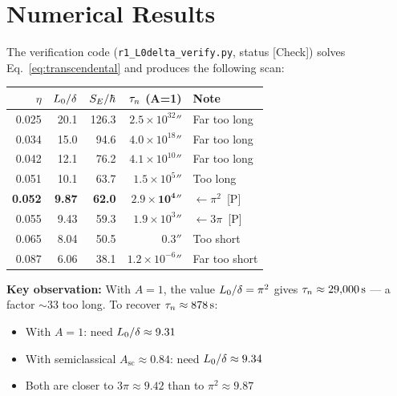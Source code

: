\section{Numerical Results}
\label{sec:L0d:results}

The verification code (\texttt{r1\_L0delta\_verify.py}, status [Check]) solves
Eq.~\eqref{eq:transcendental} and produces the following scan:

\begin{center}
\begin{tabular}{rrrrl}
\toprule
$\eta$ & $L_0/\delta$ & $S_E/\hbar$ & $\tau_n$ (A=1) & Note \\
\midrule
0.025 & 20.1 & 126.3 & $2.5 \times 10^{32}\second$ & Far too long \\
0.034 & 15.0 & 94.6  & $4.0 \times 10^{18}\second$ & Far too long \\
0.042 & 12.1 & 76.2  & $4.1 \times 10^{10}\second$ & Far too long \\
0.051 & 10.1 & 63.7  & $1.5 \times 10^{5}\second$  & Too long \\
\textbf{0.052} & \textbf{9.87} & \textbf{62.0} & $\mathbf{2.9 \times 10^{4}}\second$ &
    $\leftarrow \pi^2$~[P] \\
0.055 & 9.43 & 59.3  & $1.9 \times 10^{3}\second$  & $\leftarrow 3\pi$~[P] \\
0.065 & 8.04 & 50.5  & $0.3\second$                 & Too short \\
0.087 & 6.06 & 38.1  & $1.2 \times 10^{-6}\second$  & Far too short \\
\bottomrule
\end{tabular}
\end{center}

\textbf{Key observation:} With $A = 1$, the value $L_0/\delta = \pi^2$ gives
$\tau_n \approx 29{,}000\,\mathrm{s}$ --- a factor $\sim 33$ too long. To recover
$\tau_n \approx 878\,\mathrm{s}$:
\begin{itemize}
    \item With $A = 1$: need $L_0/\delta \approx 9.31$
    \item With semiclassical $A_{\text{sc}} \approx 0.84$: need
          $L_0/\delta \approx 9.34$
    \item Both are closer to $3\pi \approx 9.42$ than to
          $\pi^2 \approx 9.87$
\end{itemize}

